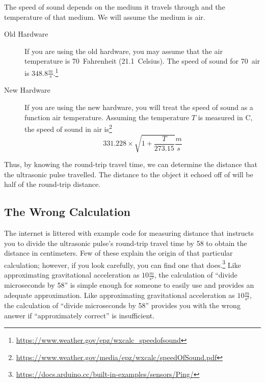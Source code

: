 The speed of sound depends on the medium it travels through and the temperature of that medium.
We will assume the medium is air.
\begin{description}
    \item[Old Hardware] If you are using the old hardware, you may assume that the air temperature is 70\degree~Fahrenheit (21.1\degree~Celsius). %
        The speed of sound for 70\degree\ air is $348.8\frac{m}{s}$.\footnote{
            \url{https://www.weather.gov/epz/wxcalc_speedofsound}
        }
    \item[New Hardware] If you are using the new hardware, you will treat the speed of sound as a function air temperature.
        Assuming the temperature $T$ is measured in \degree C, the speed of sound in air is\footnote{
        \url{https://www.weather.gov/media/epz/wxcalc/speedOfSound.pdf}
        }
        \[
            331.228 \times \sqrt{1 + \frac{T}{273.15}} \frac{m}{s}
        \]
\end{description}

Thus, by knowing the round-trip travel time, we can determine the distance that the ultrasonic pulse travelled.
The distance to the object it echoed off of will be half of the round-trip distance.

\subsection{The Wrong Calculation}

The internet is littered with example code for measuring distance that instructs you to divide the ultrasonic pulse's round-trip travel time by 58 to obtain the distance in centimeters.
Few of these explain the origin of that particular calculation; however, if you look carefully, you can find one that does.\footnote{
    \url{https://docs.arduino.cc/built-in-examples/sensors/Ping/}
}
Like approximating gravitational acceleration as $10\frac{m}{s^2}$, the calculation of ``divide microseconds by 58'' is simple enough for someone to easily use and provides an adequate approximation.
Like approximating gravitational acceleration as $10\frac{m}{s^2}$, the calculation of ``divide microseconds by 58'' provides you with the wrong answer if ``approximately correct'' is insufficient.

